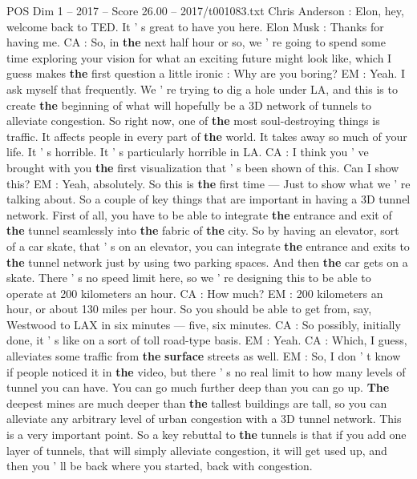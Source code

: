 \begin{textsample}{POS Dim 1 – 2017 – Score 26.00 – 2017/t001083.txt}  \label{ex:f1_pos_055}
Chris Anderson : Elon, hey, welcome back to TED.
It ' s great to have you here.
Elon Musk : Thanks for having me.
CA : So, in \textbf{the} next half hour or so, we ' re going to spend some time exploring your vision for what an exciting future might look like, which I guess makes \textbf{the} first question a little ironic : Why are you boring?
EM : Yeah.
I ask myself that frequently.
We ' re trying to dig a hole under LA, and this is to create \textbf{the} beginning of what will hopefully be a 3D network of tunnels to alleviate congestion.
So right now, one of \textbf{the} most soul-destroying things is traffic.
It affects people in every part of \textbf{the} world.
It takes away so much of your life.
It ' s horrible.
It ' s particularly horrible in LA.
CA : I think you ' ve brought with you \textbf{the} first visualization that ' s been shown of this.
Can I show this?
EM : Yeah, absolutely.
So this is \textbf{the} first time — Just to show what we ' re talking about.
So a couple of key things that are important in having a 3D tunnel network.
First of all, you have to be able to integrate \textbf{the} entrance and exit of \textbf{the} tunnel seamlessly into \textbf{the} fabric of \textbf{the} city.
So by having an elevator, sort of a car skate, that ' s on an elevator, you can integrate \textbf{the} entrance and exits to \textbf{the} tunnel network just by using two parking spaces.
And then \textbf{the} car gets on a skate.
There ' s no speed limit here, so we ' re designing this to be able to operate at 200 kilometers an hour.
CA : How much?
EM : 200 kilometers an hour, or about 130 miles per hour.
So you should be able to get from, say, Westwood to LAX in six minutes — five, six minutes.
CA : So possibly, initially done, it ' s like on a sort of toll road-type basis.
EM : Yeah.
CA : Which, I guess, alleviates some traffic from \textbf{the} \textbf{surface} streets as well.
EM : So, I don ' t know if people noticed it in \textbf{the} video, but there ' s no real limit to how many levels of tunnel you can have.
You can go much further deep than you can go up. \textbf{The} deepest mines are much deeper than \textbf{the} tallest buildings are tall, so you can alleviate any arbitrary level of urban congestion with a 3D tunnel network.
This is a very important point.
So a key rebuttal to \textbf{the} tunnels is that if you add one layer of tunnels, that will simply alleviate congestion, it will get used up, and then you ' ll be back where you started, back with congestion.

\end{textsample}

